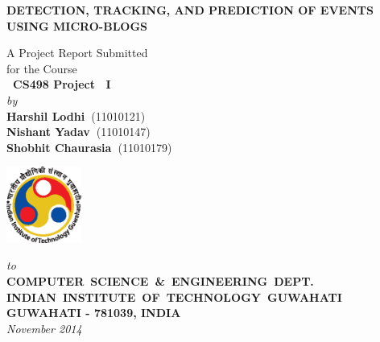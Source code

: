 \documentclass[12pt,a4paper]{report}
\begin{document}

\begin{titlepage}
\enlargethispage{1cm}

\begin{center}


\textbf{\Large DETECTION, TRACKING, AND PREDICTION OF EVENTS USING MICRO-BLOGS}

\vfill

A Project Report Submitted \\
for the Course \\[1.5cm]

{\bf\Large\ CS498 Project ~I }\\[1.5cm]


{\large \emph{by}}\\[5pt]
{\large\bf {Harshil Lodhi~}}{\large (11010121)}\\
{\large\bf {Nishant Yadav~}}{\large (11010147)}\\
{\large\bf {Shobhit Chaurasia~}}{\large (11010179)}

\vfill
\includegraphics[height=2.5cm]{figures/iitglogo}

\vspace*{0.5cm}

{\em\large to}\\[10pt]
{\bf\large \mbox {COMPUTER SCIENCE \& ENGINEERING DEPT.}} \\[5pt]
{\bf\large \mbox{INDIAN INSTITUTE OF TECHNOLOGY GUWAHATI}}\\[5pt]
{\bf\large GUWAHATI - 781039, INDIA}\\[10pt]
{\it\large November 2014}
\end{center}

\end{titlepage}

\clearpage
\end{document}
